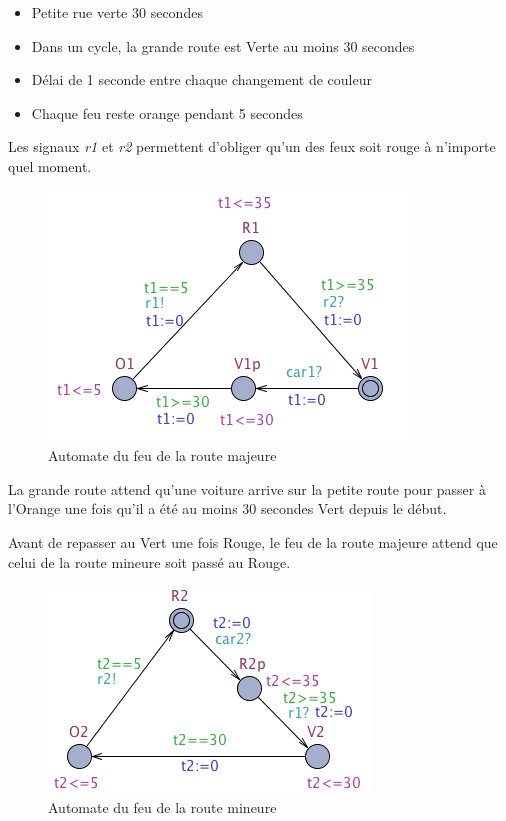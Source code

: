 \documentclass[11pt]{article}
\begin{document}
\begin{itemize}
	\item Petite rue verte 30 secondes
	\item Dans un cycle, la grande route est Verte au moins 30 secondes
	\item Délai de 1 seconde entre chaque changement de couleur
	\item Chaque feu reste orange pendant 5 secondes
\end{itemize}

Les signaux \emph{r1} et \emph{r2} permettent d'obliger qu'un des feux soit rouge à n'importe quel moment.

\begin{figure}[H]
	\centering
	\includegraphics{ressources/part3/Q10-1.png}
	\caption{Automate du feu de la route majeure}
\end{figure}

La grande route attend qu'une voiture arrive sur la petite route pour passer à l'Orange une fois qu'il a été au moins 30 secondes Vert depuis le début.

Avant de repasser au Vert une fois Rouge, le feu de la route majeure attend que celui de la route mineure soit passé au Rouge.

\begin{figure}[H]
	\centering
	\includegraphics{ressources/part3/Q10-2.png}
	\caption{Automate du feu de la route mineure}
\end{figure}
\end{document}
